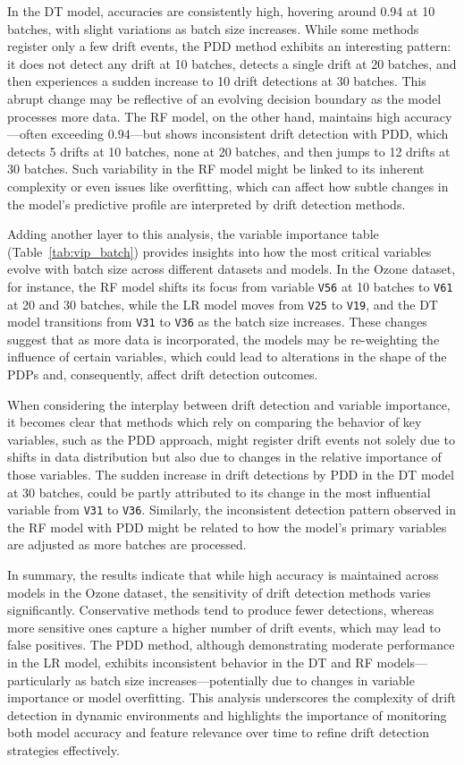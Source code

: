 \documentclass[pdflatex,sn-mathphys-ay]{sn-jnl}%
\theoremstyle{thmstyleone}%
\theoremstyle{thmstyletwo}%
\theoremstyle{thmstylethree}%
\begin{document}
In the DT model, accuracies are consistently high, hovering around 0.94 at 10 batches, with slight variations as batch size increases. While some methods register only a few drift events, the PDD method exhibits an interesting pattern: it does not detect any drift at 10 batches, detects a single drift at 20 batches, and then experiences a sudden increase to 10 drift detections at 30 batches. This abrupt change may be reflective of an evolving decision boundary as the model processes more data. The RF model, on the other hand, maintains high accuracy—often exceeding 0.94—but shows inconsistent drift detection with PDD, which detects 5 drifts at 10 batches, none at 20 batches, and then jumps to 12 drifts at 30 batches. Such variability in the RF model might be linked to its inherent complexity or even issues like overfitting, which can affect how subtle changes in the model’s predictive profile are interpreted by drift detection methods.

Adding another layer to this analysis, the variable importance table (Table~\ref{tab:vip_batch}) provides insights into how the most critical variables evolve with batch size across different datasets and models. In the Ozone dataset, for instance, the RF model shifts its focus from variable \texttt{V56} at 10 batches to \texttt{V61} at 20 and 30 batches, while the LR model moves from \texttt{V25} to \texttt{V19}, and the DT model transitions from \texttt{V31} to \texttt{V36} as the batch size increases. These changes suggest that as more data is incorporated, the models may be re-weighting the influence of certain variables, which could lead to alterations in the shape of the PDPs and, consequently, affect drift detection outcomes. 

When considering the interplay between drift detection and variable importance, it becomes clear that methods which rely on comparing the behavior of key variables, such as the PDD approach, might register drift events not solely due to shifts in data distribution but also due to changes in the relative importance of those variables. The sudden increase in drift detections by PDD in the DT model at 30 batches, could be partly attributed to its change in the most influential variable from \texttt{V31} to \texttt{V36}. Similarly, the inconsistent detection pattern observed in the RF model with PDD might be related to how the model’s primary variables are adjusted as more batches are processed.

In summary, the results indicate that while high accuracy is maintained across models in the Ozone dataset, the sensitivity of drift detection methods varies significantly. Conservative methods tend to produce fewer detections, whereas more sensitive ones capture a higher number of drift events, which may lead to false positives. The PDD method, although demonstrating moderate performance in the LR model, exhibits inconsistent behavior in the DT and RF models—particularly as batch size increases—potentially due to changes in variable importance or model overfitting. This analysis underscores the complexity of drift detection in dynamic environments and highlights the importance of monitoring both model accuracy and feature relevance over time to refine drift detection strategies effectively.
\end{document}
